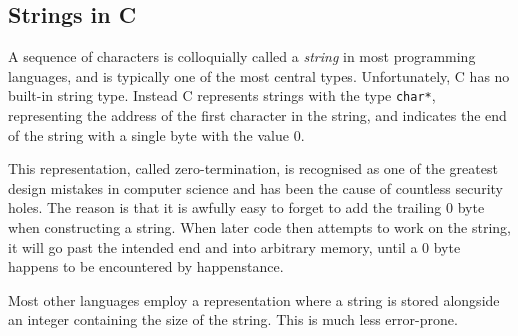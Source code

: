 \subsection{Strings in C}

A sequence of characters is colloquially called a \emph{string} in
most programming languages, and is typically one of the most central
types.  Unfortunately, C has no built-in string type.  Instead C
represents strings with the type \texttt{char*}, representing the
address of the first character in the string, and indicates the end of
the string with a single byte with the value $0$.

This representation, called zero-termination, is recognised as one of
the greatest design mistakes in computer science and has been the
cause of countless security holes.  The reason is that it is awfully
easy to forget to add the trailing $0$ byte when constructing a
string.  When later code then attempts to work on the string, it will
go past the intended end and into arbitrary memory, until a $0$ byte
happens to be encountered by happenstance.

Most other languages employ a representation where a string is stored
alongside an integer containing the size of the string.  This is much
less error-prone.

